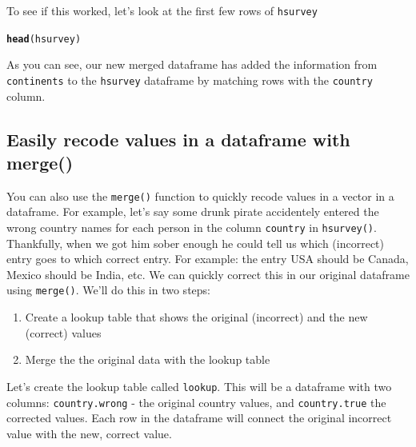 \documentclass{tufte-book}\usepackage[]{graphicx}\usepackage[]{color}
\makeatletter
\newcommand{\hlstd}[1]{\textcolor[rgb]{0.345,0.345,0.345}{#1}}%
\newcommand{\hlkwd}[1]{\textcolor[rgb]{0.737,0.353,0.396}{\textbf{#1}}}%
\newenvironment{kframe}{%
 \def\at@end@of@kframe{}%
 \ifinner\ifhmode%
  \def\at@end@of@kframe{\end{minipage}}%
  \begin{minipage}{\columnwidth}%
 \fi\fi%
 \def\FrameCommand##1{\hskip\@totalleftmargin \hskip-\fboxsep
 \colorbox{shadecolor}{##1}\hskip-\fboxsep
     \hskip-\linewidth \hskip-\@totalleftmargin \hskip\columnwidth}%
 \MakeFramed {\advance\hsize-\width
   \@totalleftmargin\z@ \linewidth\hsize
   \@setminipage}}%
 {\par\unskip\endMakeFramed%
 \at@end@of@kframe}
\newenvironment{knitrout}{}{} %
\makeatother
\begin{document}
\begin{footnotesize}
To see if this worked, let's look at the first few rows of \texttt{hsurvey}

\begin{footnotesize}
\begin{knitrout}
\color{fgcolor}\begin{kframe}
\begin{alltt}
\hlkwd{head}\hlstd{(hsurvey)}
\end{alltt}


{\ttfamily\noindent\bfseries\color{errorcolor}{\#\# Error in head(hsurvey): object 'hsurvey' not found}}\end{kframe}
\end{knitrout}
\end{footnotesize}

As you can see, our new merged dataframe has added the information from \texttt{continents} to the \texttt{hsurvey} dataframe by matching rows with the \texttt{country} column.

\subsection{Easily recode values in a dataframe with merge()}

You can also use the \texttt{merge()} function to quickly recode values in a vector in a dataframe. For example, let's say some drunk pirate accidentely entered the wrong country names for each person in the column \texttt{country} in \texttt{hsurvey()}. Thankfully, when we got him sober enough he could tell us which (incorrect) entry goes to which correct entry. For example: the entry USA should be Canada, Mexico should be India, etc. We can quickly correct this in our original dataframe using \texttt{merge()}. We'll do this in two steps:

\begin{enumerate}
\item Create a lookup table that shows the original (incorrect) and the new (correct) values
\item Merge the the original data with the lookup table
\end{enumerate}

Let's create the lookup table called \texttt{lookup}. This will be a dataframe with two columns: \texttt{country.wrong} - the original country values, and \texttt{country.true} the corrected values. Each row in the dataframe will connect the original incorrect value with the new, correct value.


\end{footnotesize}
\end{document}
